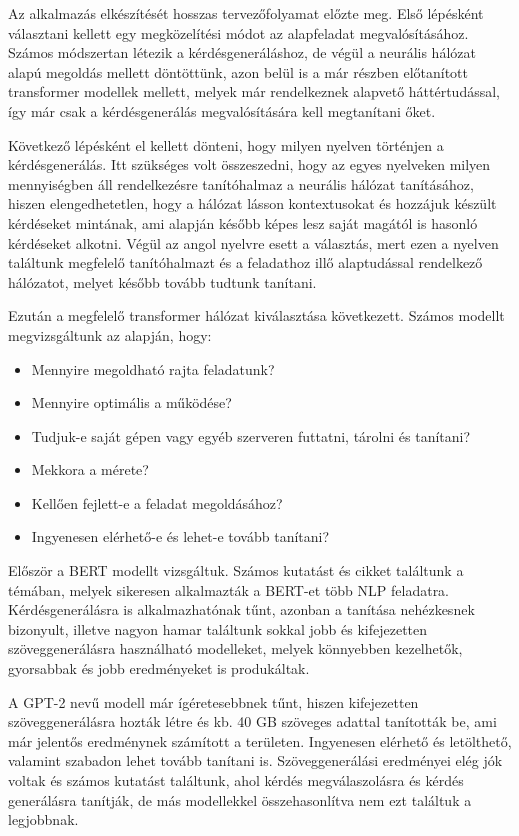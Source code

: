 
Az alkalmazás elkészítését hosszas tervezőfolyamat előzte meg. Első lépésként választani kellett egy megközelítési módot az alapfeladat megvalósításához. Számos módszertan létezik a kérdésgeneráláshoz, de végül a neurális hálózat alapú megoldás mellett döntöttünk, azon belül is a már részben előtanított transformer modellek mellett, melyek már rendelkeznek alapvető háttértudással, így már csak a kérdésgenerálás megvalósítására kell megtanítani őket.

Következő lépésként el kellett dönteni, hogy milyen nyelven történjen a kérdésgenerálás. Itt szükséges volt összeszedni, hogy az egyes nyelveken milyen mennyiségben áll rendelkezésre tanítóhalmaz a neurális hálózat tanításához, hiszen elengedhetetlen, hogy a hálózat lásson kontextusokat és hozzájuk készült kérdéseket mintának, ami alapján később képes lesz saját magától is hasonló kérdéseket alkotni. Végül az angol nyelvre esett a választás, mert ezen a nyelven találtunk megfelelő tanítóhalmazt és a feladathoz illő alaptudással rendelkező hálózatot, melyet később tovább tudtunk tanítani.

Ezután a megfelelő transformer hálózat kiválasztása következett. Számos modellt megvizsgáltunk az alapján, hogy:

\begin{itemize}
	\item Mennyire megoldható rajta feladatunk?
	\item Mennyire optimális a működése?
	\item Tudjuk-e saját gépen vagy egyéb szerveren futtatni, tárolni és tanítani?
	\item Mekkora a mérete?
	\item Kellően fejlett-e a feladat megoldásához?
	\item Ingyenesen elérhető-e és lehet-e tovább tanítani?
\end{itemize}

Először a BERT modellt vizsgáltuk. Számos kutatást és cikket találtunk a témában, melyek sikeresen alkalmazták a BERT-et több NLP feladatra. Kérdésgenerálásra is alkalmazhatónak tűnt, azonban a tanítása nehézkesnek bizonyult, illetve nagyon hamar találtunk sokkal jobb és kifejezetten szöveggenerálásra használható modelleket, melyek könnyebben kezelhetők, gyorsabbak és jobb eredményeket is produkáltak.

A GPT-2 nevű modell már ígéretesebbnek tűnt, hiszen kifejezetten szöveggenerálásra hozták létre és kb. 40 GB szöveges adattal tanították be, ami már jelentős eredménynek számított a területen. Ingyenesen elérhető és letölthető, valamint szabadon lehet tovább tanítani is. Szöveggenerálási eredményei elég jók voltak és számos kutatást találtunk, ahol kérdés megválaszolásra és kérdés generálásra tanítják, de más modellekkel összehasonlítva nem ezt találtuk a legjobbnak.


